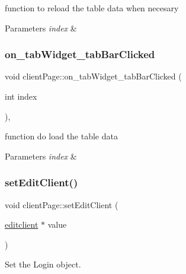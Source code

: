 function to reload the table data when necesary 


\begin{DoxyParams}{Parameters}
{\em index} & \\
\hline
\end{DoxyParams}
\mbox{\label{classclientPage_a48bd84cbd67d5fad6a221b400c3e95e7}} 
\subsubsection{\texorpdfstring{on\+\_\+tab\+Widget\+\_\+tab\+Bar\+Clicked}{on\_tabWidget\_tabBarClicked}}
{\footnotesize\ttfamily void client\+Page\+::on\+\_\+tab\+Widget\+\_\+tab\+Bar\+Clicked (\begin{DoxyParamCaption}\item[{int}]{index }\end{DoxyParamCaption})\hspace{0.3cm}{\ttfamily [private]}, {\ttfamily [slot]}}



function do load the table data 


\begin{DoxyParams}{Parameters}
{\em index} & \\
\hline
\end{DoxyParams}
\mbox{\label{classclientPage_ab16c72bc9c44d5e833206133d692c857}} 
\subsubsection{\texorpdfstring{set\+Edit\+Client()}{setEditClient()}}
{\footnotesize\ttfamily void client\+Page\+::set\+Edit\+Client (\begin{DoxyParamCaption}\item[{\hyperlink{classeditclient}{editclient} $\ast$}]{value }\end{DoxyParamCaption})}



Set the Login object. 


